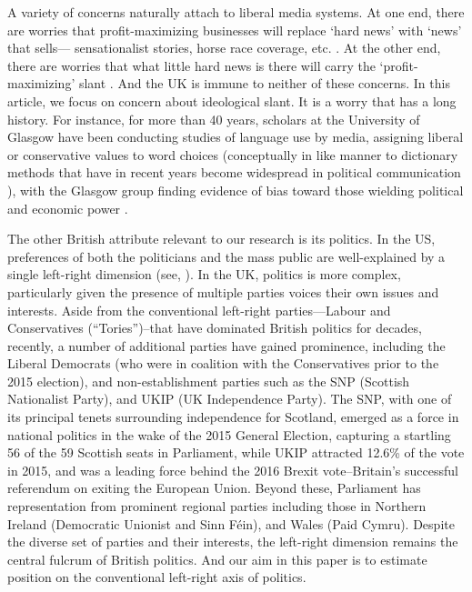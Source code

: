 \documentclass[12pt, letterpaper]{article}
\begin{document}
A variety of concerns naturally attach to liberal media systems. At one end, there are worries that profit-maximizing businesses will replace `hard news' with `news' that sells--- sensationalist stories, horse race coverage, etc. \citep{graber2014}. At the other end, there are worries that what little hard news is there will carry the `profit-maximizing' slant \citep{gentzkow2010}. And the UK is immune to neither of these concerns. In this article, we focus on concern about ideological slant. It is a worry that has a long history. For instance, for more than 40 years, scholars at the University of Glasgow have been conducting studies of language use by media, assigning liberal or conservative values to word choices (conceptually in like manner to dictionary methods that have in recent years become widespread in political communication \citep{young2012}), with the Glasgow group finding evidence of bias toward those wielding political and economic power \citep{glasgow1976, glasgow1980, glasgow1982}.

The other British attribute relevant to our research is its politics. In the US, preferences of both the politicians and the mass public are well-explained by a single left-right dimension (see, \citealp{poole2007,clinton2004,jessee2009,tausanovitch2013}). In the UK, politics is more complex, particularly given the presence of multiple parties voices their own issues and interests. Aside from the conventional left-right parties---Labour and Conservatives (``Tories'')--that have dominated British politics for decades, recently, a number of additional parties have gained prominence, including the Liberal Democrats (who were in coalition with the Conservatives prior to the 2015 election), and non-establishment parties such as the SNP (Scottish Nationalist Party), and UKIP (UK Independence Party). The SNP, with one of its principal tenets surrounding independence for Scotland, emerged as a force in national politics in the wake of the 2015 General Election, capturing a startling 56 of the 59 Scottish seats in Parliament, while UKIP attracted 12.6\% of the vote in 2015, and was a leading force behind the 2016 Brexit vote--Britain's successful referendum on exiting the European Union. Beyond these, Parliament has representation from prominent regional parties including those in Northern Ireland (Democratic Unionist and Sinn F\'{e}in), and Wales (Paid Cymru). Despite the diverse set of parties and their interests, the left-right dimension remains the central fulcrum of British politics. And our aim in this paper is to estimate position on the conventional left-right axis of politics.
\end{document}
